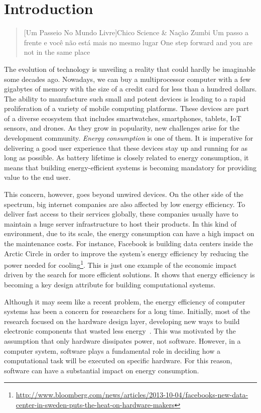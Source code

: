 \chapter{Introduction}\label{chp:introduction}

\begin{quotation}[Um Passeio No Mundo Livre]{Chico Science \& Nação Zumbi}
Um passo a frente e você não está mais no mesmo lugar
\linebreak
One step forward and you are not in the same place
\end{quotation}

The evolution of technology is unveiling a reality that could hardly be imaginable some decades ago. Nowadays, we can buy a multiprocessor computer with a few gigabytes of memory with the size of a credit card for less than a hundred dollars. The ability to manufacture such small and potent devices is leading to a rapid proliferation of a variety of mobile computing platforms. These devices are part of a diverse ecosystem that includes smartwatches, smartphones, tablets, IoT sensors, and drones. As they grow in popularity, new challenges arise for the development community. \emph{Energy consumption} is one of them. It is imperative for delivering a good user experience that these devices stay up and running for as long as possible. As battery lifetime is closely related to energy consumption, it means that building energy-efficient systems is becoming mandatory for providing value to the end user.

This concern, however, goes beyond unwired devices. On the other side of the spectrum, big internet companies are also affected by low energy efficiency. To deliver fast access to their services globally, these companies usually have to maintain a huge server infrastructure to host their products. In this kind of environment, due to its scale, the energy consumption can have a high impact on the maintenance costs. For instance, Facebook is building data centers inside the Arctic Circle in order to improve the system's energy efficiency by reducing the power needed for cooling\footnote{\scriptsize\url{http://www.bloomberg.com/news/articles/2013-10-04/facebooks-new-data-center-in-sweden-puts-the-heat-on-hardware-makers}}. This is just one example of the economic impact driven by the search for more efficient solutions. It shows that energy efficiency is becoming a key design attribute for building computational systems.

Although it may seem like a recent problem, the energy efficiency of computer systems has been a concern for researchers for a long time. Initially, most of the research focused on the hardware design layer, developing new ways to build electronic components that wasted less energy~\cite{chandrakasan:1992}. This was motivated by the assumption that only hardware dissipates power, not software. However, in a computer system, software plays a fundamental role in deciding how a computational task will be executed on specific hardware. For this reason, software can have a substantial impact on energy consumption.

